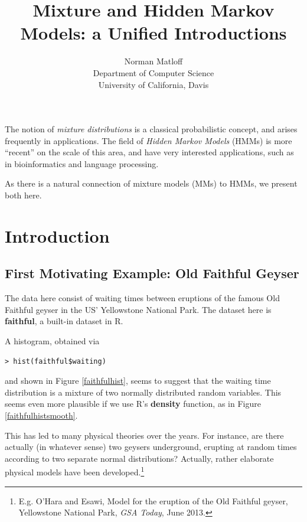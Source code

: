 \documentclass[11pt]{article}
\begin{document}
 

\title{Mixture and Hidden Markov Models: a Unified Introductions}
\author{Norman Matloff \\
   Department of Computer Science \\
   University of California, Davis}

\maketitle

The notion of \textit{mixture distributions} is a classical
probabilistic concept, and arises frequently in applications.  The field
of \textit{Hidden Markov Models} (HMMs) is more ``recent'' on the scale
of this area, and have very interested applications, such as in
bioinformatics and language processing.

As there is a natural connection of mixture models (MMs) to HMMs, we
present both here.  

\section{Introduction}

\subsection{First Motivating Example:  Old Faithful Geyser}

The data here consist of waiting times between eruptions of the famous
Old Faithful geyser in the US' Yellowstone National Park.  The dataset
here is \textbf{faithful}, a built-in dataset in R.

A histogram, obtained via 

\begin{lstlisting}
> hist(faithful$waiting)
\end{lstlisting}

and shown in Figure \ref{faithfulhist}, seems to suggest that the
waiting time distribution is a mixture of two normally distributed random
variables.  This seems even more plausible if we use R's
\textbf{density} function, as in Figure \ref{faithfulhistsmooth}.

This has led to many physical theories over the years.  For instance,
are there actually (in whatever sense) two geysers underground, erupting 
at random times according to two separate normal distributions?
Actually, rather elaborate physical models have been
developed.\footnote{E.g. O'Hara and Esawi, 
Model for the eruption of the Old Faithful geyser, Yellowstone National
Park, \textit{GSA Today}, June 2013.} 
\end{document}
